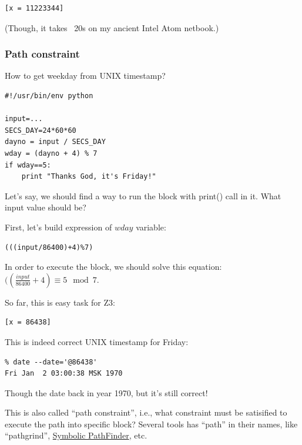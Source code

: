 

\begin{lstlisting}
[x = 11223344]
\end{lstlisting}

(Though, it takes ~20s on my ancient Intel Atom netbook.)

\subsubsection{Path constraint}

How to get weekday from UNIX timestamp?

\begin{lstlisting}
#!/usr/bin/env python

input=...
SECS_DAY=24*60*60
dayno = input / SECS_DAY
wday = (dayno + 4) % 7
if wday==5:
    print "Thanks God, it's Friday!"
\end{lstlisting}

Let's say, we should find a way to run the block with print() call in it.
What input value should be?

First, let's build expression of $wday$ variable:



\begin{lstlisting}
(((input/86400)+4)%7)
\end{lstlisting}

In order to execute the block, we should solve this equation: $((\frac{input}{86400}+4) \equiv 5 \mod 7$.

So far, this is easy task for Z3:



\begin{lstlisting}
[x = 86438]
\end{lstlisting}

This is indeed correct UNIX timestamp for Friday:

\begin{lstlisting}
% date --date='@86438'
Fri Jan  2 03:00:38 MSK 1970
\end{lstlisting}

Though the date back in year 1970, but it's still correct!

This is also called ``path constraint'', i.e., what constraint must be satisified to execute the path into
specific block?
Several tools has ``path'' in their names, like
``pathgrind'', 
\href{http://babelfish.arc.nasa.gov/trac/jpf/wiki/projects/jpf-symbc}{Symbolic PathFinder}, etc.


